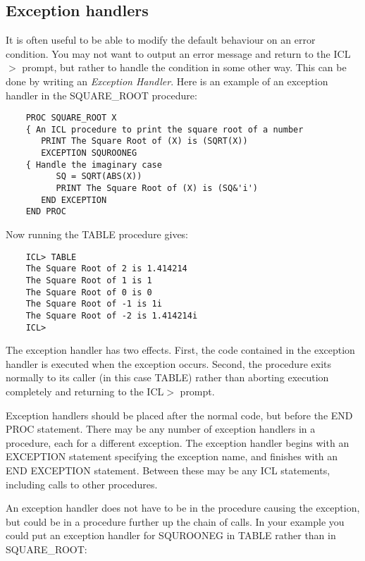 \subsection{Exception handlers}

It is often useful to be able to modify the default behaviour on an error
condition.
You may not want to output an error message and return to the ICL$>$ prompt, but
rather to handle the condition in some other way.
This can be done by writing an {\em Exception Handler}.
Here is an example of an exception handler in the SQUARE\_ROOT procedure:

\begin{small}
\begin{verbatim}
    PROC SQUARE_ROOT X
    { An ICL procedure to print the square root of a number
       PRINT The Square Root of (X) is (SQRT(X))
       EXCEPTION SQUROONEG
    { Handle the imaginary case
          SQ = SQRT(ABS(X))
          PRINT The Square Root of (X) is (SQ&'i')
       END EXCEPTION
    END PROC
\end{verbatim}
\end{small}

Now running the TABLE procedure gives:

\begin{small}
\begin{verbatim}
    ICL> TABLE
    The Square Root of 2 is 1.414214
    The Square Root of 1 is 1
    The Square Root of 0 is 0
    The Square Root of -1 is 1i
    The Square Root of -2 is 1.414214i
    ICL>
\end{verbatim}
\end{small}

The exception handler has two effects.
First, the code contained in the exception handler is executed when the
exception occurs.
Second, the procedure exits normally to its caller (in this case TABLE) rather
than aborting execution completely and returning to the ICL$>$ prompt.

Exception handlers should be placed after the normal code, but before the END
PROC statement.
There may be any number of exception handlers in a procedure, each for a
different exception.
The exception handler begins with an EXCEPTION statement specifying the
exception name, and finishes with an END EXCEPTION statement.
Between these may be any ICL statements, including calls to other procedures.

An exception handler does not have to be in the procedure causing the exception,
but could be in a procedure further up the chain of calls.
In your example you could put an exception handler for SQUROONEG in TABLE rather
than in SQUARE\_ROOT:


